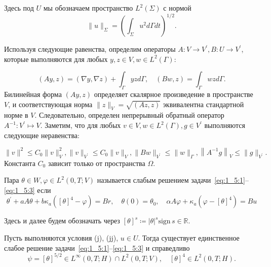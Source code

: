 Здесь под $U$ мы обозначаем пространство $L^{2}(\Sigma)$ с нормой
\[
    \|u\|_{\Sigma}=\left(\int_{\Sigma} u^{2} d \Gamma d t\right)^{1/2}.
\]

Используя следующие равенства, определим операторы $A: V \rightarrow V^{\prime}, B: U \rightarrow V^{\prime}$,
которые выполняются для любых $y, z \in V, w \in L^{2}(\Gamma)$:

\[
    (A y, z)=(\nabla y, \nabla z)+\int_{\Gamma} y z d \Gamma, \quad(B w, z)=\int_{\Gamma} w z d \Gamma.
\]
Билинейная форма $(A y, z)$ определяет скалярное произведение в пространстве $V$,
и соответствующая норма $\|z\|_{V}=\sqrt{(A z, z)}$ эквивалентна стандартной норме в $V$.
Следовательно, определен непрерывный обратный оператор
$A^{-1}: V^{\prime} \mapsto V$.
Заметим, что для любых $v \in V, w \in L^{2}(\Gamma), g \in V^{\prime}$
выполняются следующие неравенства:

\[
    \|v\|^{2} \leq C_{0}\|v\|_{V}^{2},\|v\|_{V^{\prime}} \leq C_{0}\|v\|_{V},
    \|B w\|_{V^{\prime}} \leq\|w\|_{\Gamma},\left\|A^{-1} g\right\|_{V} \leq\|g\|_{V^{\prime}}.
\]
Константа $C_0$ зависит только от пространства $\Omega$.

\begin{definition}
    Пара $\theta \in W, \varphi \in L^{2}(0, T ; V)$
    называется слабым решением задачи~\eqref{eq:1_5:1}--\eqref{eq:1_5:3}
    если
    \begin{equation}
        \label{eq:1_5:weak}
        \theta^{\prime}+a A \theta+b \kappa_{a}\left([\theta]^{4}-\varphi\right)=B r,
        \quad \theta(0)=\theta_{0}, \quad \alpha A \varphi+\kappa_{a}\left(\varphi-[\theta]^{4}\right)=B u
    \end{equation}
\end{definition}
Здесь и далее будем обозначать через
$[\theta]^s \coloneqq |\theta|^s \mathrm{sign}\,s  \in \mathbb{R}$.
\begin{lemma}
    \label{lm:1_5:1}
    Пусть выполняются условия (j), (jj), $u \in U$.
    Тогда существует единственное слабое решение задачи~\eqref{eq:1_5:1}--\eqref{eq:1_5:3} и справедливо
    \[
        \psi=[\theta]^{5 / 2} \in L^{\infty}(0, T ; H) \cap L^{2}(0, T ; V),
        \quad[\theta]^{4} \in L^{2}(0, T ; H).
    \]
\end{lemma}

